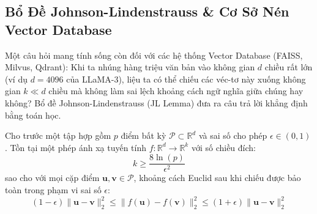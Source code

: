 \subsection{Bổ Đề Johnson-Lindenstrauss \& Cơ Sở Nén Vector Database}

Một câu hỏi mang tính sống còn đối với các hệ thống Vector Database (FAISS, Milvus, Qdrant): Khi ta nhúng hàng triệu văn bản vào không gian $d$ chiều rất lớn (ví dụ $d = 4096$ của LLaMA-3), liệu ta có thể chiếu các véc-tơ này xuống không gian $k \ll d$ chiều mà không làm sai lệch khoảng cách ngữ nghĩa giữa chúng hay không? Bổ đề Johnson-Lindenstrauss (JL Lemma) đưa ra câu trả lời khẳng định bằng toán học.

\begin{theorem}
Cho trước một tập hợp gồm $p$ điểm bất kỳ $\mathcal{P} \subset \mathbb{R}^d$ và sai số cho phép $\epsilon \in (0, 1)$. Tồn tại một phép ánh xạ tuyến tính $f: \mathbb{R}^d \to \mathbb{R}^k$ với số chiều đích:
\begin{equation}
k \ge \frac{8 \ln(p)}{\epsilon^2}
\end{equation}
sao cho với mọi cặp điểm $\mathbf{u}, \mathbf{v} \in \mathcal{P}$, khoảng cách Euclid sau khi chiếu được bảo toàn trong phạm vi sai số $\epsilon$:
\begin{equation}
(1 - \epsilon) \|\mathbf{u} - \mathbf{v}\|_2^2 \le \|f(\mathbf{u}) - f(\mathbf{v})\|_2^2 \le (1 + \epsilon) \|\mathbf{u} - \mathbf{v}\|_2^2
\end{equation}
\end{theorem}

